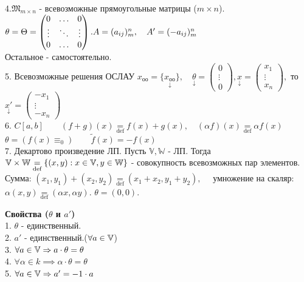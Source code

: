 \documentclass[../main.tex]{subfiles}
\begin{document}
\\4.$\mathfrak{M}_{m\times n}$ - всевозможные прямоугольные матрицы ($m\times n$). $\theta=\Theta = \begin{pmatrix}
    0 & \ldots & 0\\ 
    \vdots & \ddots & \vdots\\ 
    0 & \ldots & 0
\end{pmatrix}. \\ A = (a_{ij})_{m}^{n},\quad A' =(-a_{ij})_{m}^{n}$
\\ Остальное - самостоятельно.
\\5. Всевозможные решения ОСЛАУ $x_{\text{оо}}=\{\underset{\downarrow}{x_{\text{оо}}}\},\quad \underset{\downarrow}{\theta}=\begin{pmatrix}
    0 \\ 
    \vdots \\
    0
\end{pmatrix}, \underset{\downarrow}{ x}=\begin{pmatrix}
    x_{1} \\ 
    \vdots \\ 
    x_{n}
\end{pmatrix}, $ то $\underset{\downarrow}{x'}= \begin{pmatrix}
    -x_{1} \\ 
    \vdots \\ 
    -x_{n}
\end{pmatrix}$
\\6. $C[a,b]\qquad (f+g)(x)\underset{\text{def}}{=} f(x)+g(x), \quad (\alpha f)(x)\underset{\text{def}}{=}\alpha f(x)$
\\$\theta=\left(f(x)\equiv_{0}\right)\qquad \tilde{f}(x)=-f(x)$ 
\\7. Декартово произведение ЛП. Пусть $\mathbb{V},\mathbb{W} $ - ЛП. Тогда $\mathbb{V} \times \mathbb{W}\underset{\text{def}}{=} \{(x,y):x\in\mathbb{V}, y\in\mathbb{W}\}$ - совокупность всевозможных пар элементов. 
\\Сумма: $(x_{1},y_{1})+(x_{2},y_{2})\underset{\text{def}}{=}(x_{1}+x_{2},y_{1}+y_{2}),\quad$ умножение на скаляр: $ \alpha (x,y)\underset{\text{def}}{=}(\alpha x,\alpha y)$. $\theta=(0,0)$.

\vspace{0.5cm}
\textbf{Свойства ($\theta$ и $a'$)}
\\1. $\theta$ - единственный. 
\\2. $a'$ - единственный.\;($\forall a \in \mathbb{V}$)
\\3. $\forall a \in \mathbb{V} \Rightarrow  a\cdot \theta =\theta$
\\4. $\forall \alpha \in k \implies \alpha \cdot \theta=\theta$
\\5. $\forall a \in \mathbb{V} \Rightarrow a' = -1 \cdot a$
\end{document}
